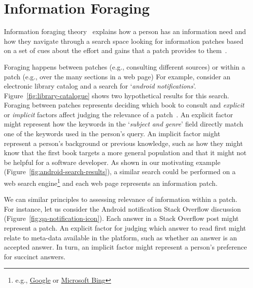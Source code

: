 



\section{Information Foraging}
\label{cp2:information-foraging}



Information foraging theory~\cite{Pirolli1999} explains how a person
has an information need and how they navigate through  
a search space looking for information patches  based on 
a set of cues about the effort and gains that a patch provides to them~\cite{Pirolli1999}.




Foraging happens between patches (e.g., consulting different sources) or within a patch (e.g., over the many sections in a web page) 
For example,
consider an electronic library catalog and a search for `\textit{android notifications}'.
Figure~\ref{fig:library-catalogue} shows two hypothetical results for this search. 
Foraging between patches represents deciding which book to consult 
and \textit{explicit} or \textit{implicit} factors affect judging the relevance of a patch~\cite{saracevic1975}.
An explicit factor might represent how the keywords in the `\textit{subject and genre}' field
directly match one of the keywords used in the person's query. An implicit factor might represent 
a person's background or previous knowledge, such as how 
they might know that the first book targets a more general population and 
that it might not be helpful for a software developer.
As shown in our motivating example (Figure~\ref{fig:android-search-results}),
a similar search could be performed on a web search engine\footnote{e.g., \href{https://www.google.com/}{Google} or \href{https://www.bing.com/}{Microsoft Bing}}
and each web page represents an information patch.






We can  similar principles to assessing relevance of information within a patch. 
For instance, let us consider the Android notification Stack Overflow discussion (Figure~\ref{fig:qa-notification-icon}).
Each answer in a Stack Overflow post might represent a patch.
An explicit factor for judging which answer to read first might relate to 
meta-data available in the platform, such as whether an answer is an accepted answer.
In turn, an implicit factor might represent a person's preference for succinct answers.







